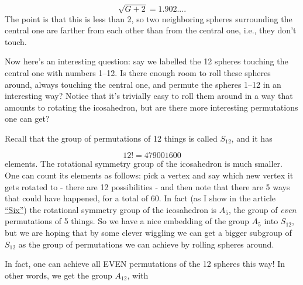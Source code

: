 \[ \sqrt{G + 2} =  1.902....\]
The point is that this is less than 2, so two neighboring spheres surrounding the central one are farther from each other than from the central one, i.e., they don't touch.

Now here's an interesting question: say we labelled the 12 spheres touching the central one with numbers 1--12. Is there enough room to roll these spheres around, always touching the central one, and permute the spheres 1--12 in an interesting way? Notice that it's trivially easy to roll them around in a way that amounts to rotating the icosahedron, but are there more interesting permutations one can get?

Recall that the group of permutations of 12 things is called $S_{12}$, and it has

\[ 12! = 479001600\]
elements. The rotational symmetry group of the icosahedron is much smaller. One can count its elements as follows: pick a vertex and say which new vertex it gets rotated to - there are 12 possibilities - and then note that there are 5 ways that could have happened, for a total of 60. In fact (as I show in the article \href{http://math.ucr.edu/home/baez/six.html}{``Six''}) the rotational symmetry group of the icosahedron is $A_5$, the group of \emph{even} permutations of 5 things. So we have a nice embedding of the group $A_5$ into $S_{12}$, but we are hoping that by some clever wiggling we can get a bigger subgroup of $S_{12}$ as the group of permutations we can achieve by rolling spheres around.

In fact, one can achieve all EVEN permutations of the 12 spheres this way! In other words, we get the group $A_{12}$, with

